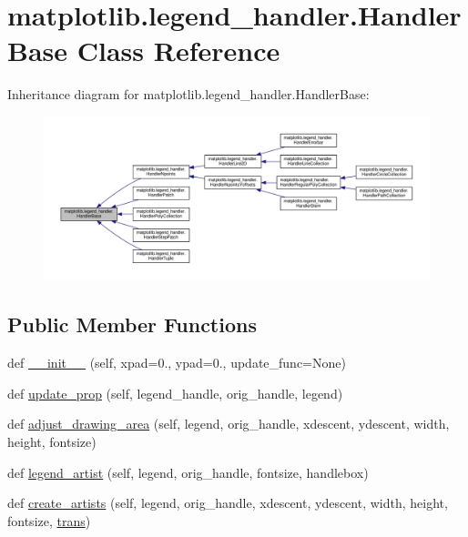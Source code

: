 \hypertarget{classmatplotlib_1_1legend__handler_1_1HandlerBase}{}\section{matplotlib.\+legend\+\_\+handler.\+Handler\+Base Class Reference}
\label{classmatplotlib_1_1legend__handler_1_1HandlerBase}


Inheritance diagram for matplotlib.\+legend\+\_\+handler.\+Handler\+Base\+:
\nopagebreak
\begin{figure}[H]
\begin{center}
\leavevmode
\includegraphics[width=350pt]{classmatplotlib_1_1legend__handler_1_1HandlerBase__inherit__graph}
\end{center}
\end{figure}
\subsection*{Public Member Functions}
\begin{DoxyCompactItemize}
\item 
def \hyperlink{classmatplotlib_1_1legend__handler_1_1HandlerBase_a5d635ce240558604bd57cd841cc101b2}{\+\_\+\+\_\+init\+\_\+\+\_\+} (self, xpad=0., ypad=0., update\+\_\+func=None)
\item 
def \hyperlink{classmatplotlib_1_1legend__handler_1_1HandlerBase_aa54fa79fee69bfec676d9b59b76a29e6}{update\+\_\+prop} (self, legend\+\_\+handle, orig\+\_\+handle, legend)
\item 
def \hyperlink{classmatplotlib_1_1legend__handler_1_1HandlerBase_aff7f166b8af0935e3d1cded5853a38d2}{adjust\+\_\+drawing\+\_\+area} (self, legend, orig\+\_\+handle, xdescent, ydescent, width, height, fontsize)
\item 
def \hyperlink{classmatplotlib_1_1legend__handler_1_1HandlerBase_a458640f1dbc72904fbb4ae47d6b518cf}{legend\+\_\+artist} (self, legend, orig\+\_\+handle, fontsize, handlebox)
\item 
def \hyperlink{classmatplotlib_1_1legend__handler_1_1HandlerBase_a69710f39ecb263cd4d9c803104bc1310}{create\+\_\+artists} (self, legend, orig\+\_\+handle, xdescent, ydescent, width, height, fontsize, \hyperlink{size_2foo_8f90_afabfd8da71309850231a00e53c61f106}{trans})
\end{DoxyCompactItemize}


